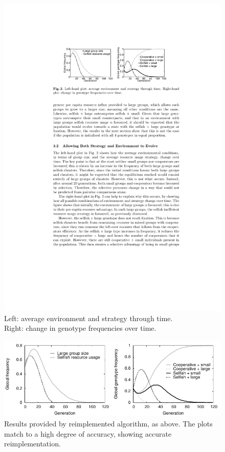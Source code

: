 \documentclass[11pt]{article}
\begin{document}
\begin{figure}[!ht]
  \centering
  \includegraphics[scale=1.25]{original.pdf}
  \caption{Left: average environment and strategy through time. \\Right: change in genotype frequencies over time. \citep{orig} }
  \label{fig:original}
\end{figure}

\begin{figure}[!ht]
  \centering
  \includegraphics{equalplot.pdf}
  \caption{Results provided by reimplemented algorithm, as above. The plots match to a high degree of accuracy, showing accurate reimplementation. %
  }
  \label{fig:equalplot}
\end{figure}
\end{document}
